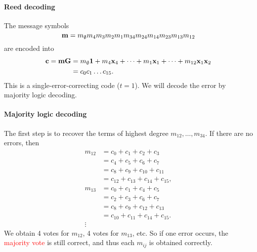 \documentclass[a4paper, 11pt, openany]{book}
\numberwithin{equation}{section}
\theoremstyle{plain}
\theoremstyle{definition}
\newcommand{\Important}[1]{\textcolor{red}{#1}}
\begin{document}
\paragraph{Reed decoding}
The message symbols 
\[
	{\bf m} = m_\emptyset m_4 m_3 m_2 m_1 m_{34} m_{24} m_{14} m_{23} m_{13} m_{12}
\]
are encoded into
\begin{align*}
	{\bf c} = {\bf m} {\bf G} &= m_\emptyset {\bf 1} + m_4 {\bf x}_4 + \dots + m_1 {\bf x}_1 + \dots + m_{12} {\bf x}_1 {\bf x}_2\\
	&= c_0 c_1 \dots c_{15}. 
\end{align*}
This is a single-error-correcting code ($t=1$). We will decode the error by majority logic decoding.


\paragraph{Majority logic decoding}
The first step is to recover the terms of highest degree $m_{12}, \dots, m_{34}$. If there are no errors, then
\begin{align*}
	m_{12} &= c_0 + c_1 + c_2 + c_3\\
	&= c_4 + c_5 + c_6 + c_7\\
	&= c_8 + c_9 + c_{10} + c_{11}\\
	&= c_{12} + c_{13} + c_{14} + c_{15},\\
	m_{13} &= c_0 + c_1 + c_4 + c_5\\
	&= c_2 + c_3 + c_6 + c_7\\
	&= c_8 + c_9 + c_{12} + c_{13}\\
	&= c_{10} + c_{11} + c_{14} + c_{15}.\\
	\vdots
\end{align*}
We obtain 4 votes for $m_{12}$, 4 votes for $m_{13}$, etc. So if one error occurs, the \Important{majority vote} is still correct, and thus each $m_{ij}$ is obtained correctly.
\end{document}

